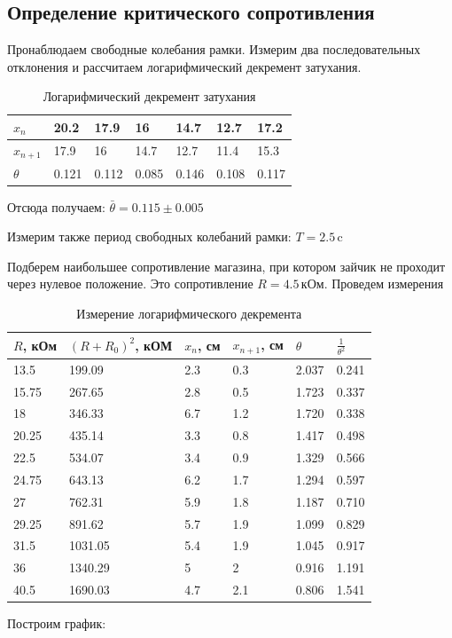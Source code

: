 \documentclass[a4paper,12pt]{article}
\begin{document}
	
\subsection{Определение критического сопротивления}
Пронаблюдаем свободные колебания рамки. Измерим два последовательных отклонения и рассчитаем логарифмический декремент затухания.

\begin{table}[h]
	\centering
	\caption{Логарифмический декремент затухания}
	\label{my-label}
	\begin{tabular}{|l|l|l|l|l|l|l|}
		\hline
		$x_n$ & 20.2  & 17.9  & 16    & 14.7  & 12.7  & 17.2  \\ \hline
		$x_{n+1}$ & 17.9  & 16    & 14.7  & 12.7  & 11.4  & 15.3  \\ \hline
		$\theta $ & 0.121 & 0.112 & 0.085 & 0.146 & 0.108 & 0.117 \\ \hline
	\end{tabular}
\end{table}

Отсюда получаем: $\bar{\theta} = 0.115 \pm 0.005$

Измерим также период свободных колебаний рамки: $T = 2.5\,$c

Подберем наибольшее сопротивление магазина, при котором зайчик не проходит через нулевое положение. Это сопротивление $R = 4.5\,$кОм. Проведем измерения 

\begin{table}[h!]
	\centering
	\caption{Измерение логарифмического декремента}
	\label{my-label}
	\begin{tabular}{|l|l|l|l|l|l|}
		\hline
		$R$, кОм & $\left(R+R_0\right)^2$, кОМ    & $x_n$, см     & $x_{n+1}$, см      &  $\theta$ & $\frac{1}{\theta^2}$    \\ \hline
		13.5  & 199.09  & 2.3 & 0.3 & 2.037 & 0.241 \\ \hline
		15.75 & 267.65  & 2.8 & 0.5 & 1.723 & 0.337 \\ \hline
		18    & 346.33  & 6.7 & 1.2 & 1.720 & 0.338 \\ \hline
		20.25 & 435.14  & 3.3 & 0.8 & 1.417 & 0.498 \\ \hline
		22.5  & 534.07  & 3.4 & 0.9 & 1.329 & 0.566 \\ \hline
		24.75 & 643.13  & 6.2 & 1.7 & 1.294 & 0.597 \\ \hline
		27    & 762.31  & 5.9 & 1.8 & 1.187 & 0.710 \\ \hline
		29.25 & 891.62  & 5.7 & 1.9 & 1.099 & 0.829 \\ \hline
		31.5  & 1031.05 & 5.4 & 1.9 & 1.045 & 0.917 \\ \hline
		36    & 1340.29 & 5   & 2   & 0.916 & 1.191 \\ \hline
		40.5  & 1690.03 & 4.7 & 2.1 & 0.806 & 1.541 \\ \hline
	\end{tabular}
\end{table}
\pagebreak
Построим график:
\end{document}
